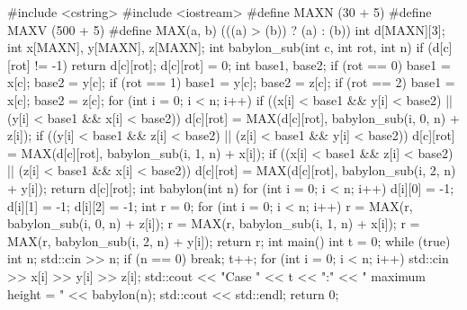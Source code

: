 \begin{cppcode}
#include <cstring>
#include <iostream>
#define MAXN (30 + 5)
#define MAXV (500 + 5)
#define MAX(a, b) (((a) > (b)) ? (a) : (b))
int d[MAXN][3];
int x[MAXN], y[MAXN], z[MAXN];
int babylon_sub(int c, int rot, int n) {
  if (d[c][rot] != -1) {
    return d[c][rot];
  }
  d[c][rot] = 0;
  int base1, base2;
  if (rot == 0) {
    base1 = x[c];
    base2 = y[c];
  }
  if (rot == 1) {
    base1 = y[c];
    base2 = z[c];
  }
  if (rot == 2) {
    base1 = x[c];
    base2 = z[c];
  }
  for (int i = 0; i < n; i++) {
    if ((x[i] < base1 && y[i] < base2) || (y[i] < base1 && x[i] < base2))
      d[c][rot] = MAX(d[c][rot], babylon_sub(i, 0, n) + z[i]);
    if ((y[i] < base1 && z[i] < base2) || (z[i] < base1 && y[i] < base2))
      d[c][rot] = MAX(d[c][rot], babylon_sub(i, 1, n) + x[i]);
    if ((x[i] < base1 && z[i] < base2) || (z[i] < base1 && x[i] < base2))
      d[c][rot] = MAX(d[c][rot], babylon_sub(i, 2, n) + y[i]);
  }
  return d[c][rot];
}
int babylon(int n) {
  for (int i = 0; i < n; i++) {
    d[i][0] = -1;
    d[i][1] = -1;
    d[i][2] = -1;
  }
  int r = 0;
  for (int i = 0; i < n; i++) {
    r = MAX(r, babylon_sub(i, 0, n) + z[i]);
    r = MAX(r, babylon_sub(i, 1, n) + x[i]);
    r = MAX(r, babylon_sub(i, 2, n) + y[i]);
  }
  return r;
}
int main() {
  int t = 0;
  while (true) {
    int n;
    std::cin >> n;
    if (n == 0) break;
    t++;
    for (int i = 0; i < n; i++) {
      std::cin >> x[i] >> y[i] >> z[i];
    }
    std::cout << "Case " << t << ":"
              << " maximum height = " << babylon(n);
    std::cout << std::endl;
  }
  return 0;
}
\end{cppcode}
